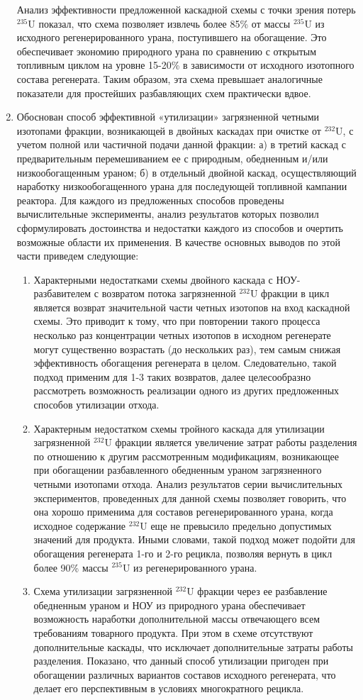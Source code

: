 \begin{enumerate}
Анализ эффективности предложенной каскадной схемы с точки зрения потерь $^{235}$U показал, что схема позволяет извлечь более 85\% от массы $^{235}$U из исходного регенерированного урана, поступившего на обогащение. Это обеспечивает экономию природного урана по сравнению с открытым топливным циклом на уровне 15-20\% в зависимости от исходного изотопного состава регенерата. Таким образом, эта схема превышает аналогичные показатели для простейших разбавляющих схем практически вдвое.
\item Обоснован способ эффективной «утилизации» загрязненной четными изотопами фракции, возникающей в двойных каскадах при очистке от $^{232}$U, с учетом полной или частичной подачи данной фракции: а) в третий каскад с предварительным перемешиванием ее с природным, обедненным и/или низкообогащенным ураном; б) в отдельный двойной каскад, осуществляющий наработку низкообогащенного урана для последующей топливной кампании реактора. Для каждого из предложенных способов проведены вычислительные эксперименты, анализ результатов которых позволил сформулировать достоинства и недостатки каждого из способов и очертить возможные области их применения.
В качестве основных выводов по этой части приведем следующие:
\begin{enumerate}
\item Характерными недостатками схемы двойного каскада с НОУ-разбавителем с возвратом потока загрязненной $^{232}$U фракции в цикл является возврат значительной части четных изотопов на вход каскадной схемы. Это приводит к тому, что при повторении такого процесса несколько раз концентрации четных изотопов в исходном регенерате могут существенно возрастать (до нескольких раз), тем самым снижая эффективность обогащения регенерата в целом. Следовательно, такой подход применим для 1-3 таких возвратов, далее целесообразно рассмотреть возможность реализации одного из других предложенных способов утилизации отхода.
\item Характерным недостатком схемы тройного каскада для утилизации загрязненной $^{232}$U фракции является увеличение затрат работы разделения по отношению к другим рассмотренным модификациям, возникающее при обогащении разбавленного обедненным ураном загрязненного четными изотопами отхода. Анализ результатов серии вычислительных экспериментов, проведенных для данной схемы позволяет говорить, что она хорошо применима для составов регенерированного урана, когда исходное содержание $^{232}$U еще не превысило предельно допустимых значений для продукта. Иными словами, такой подход может подойти для обогащения регенерата 1-го и 2-го рецикла, позволяя вернуть в цикл более 90\% массы $^{235}$U из регенерированного урана. 
\item Схема утилизации загрязненной $^{232}$U фракции через ее разбавление обедненным ураном и НОУ из природного урана обеспечивает возможность наработки дополнительной массы отвечающего всем требованиям товарного продукта. При этом в схеме отсутствуют дополнительные каскады, что исключает дополнительные затраты работы разделения. Показано, что данный способ утилизации пригоден при обогащении различных вариантов составов исходного регенерата, что делает его перспективным в условиях многократного рецикла.
\end{enumerate}


\end{enumerate}
